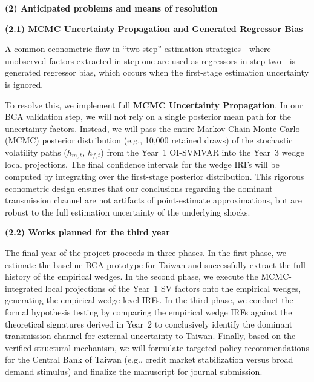 \bigskip

\noindent\textbf{(2) Anticipated problems and means of resolution}

\bigskip

\noindent\textbf{(2.1) MCMC Uncertainty Propagation and Generated Regressor Bias}

\medskip

A common econometric flaw in ``two-step'' estimation strategies---where unobserved factors extracted in step one are used as regressors in step two---is generated regressor bias, which occurs when the first-stage estimation uncertainty is ignored. 

To resolve this, we implement full \textbf{MCMC Uncertainty Propagation}. In our BCA validation step, we will not rely on a single posterior mean path for the uncertainty factors. Instead, we will pass the entire Markov Chain Monte Carlo (MCMC) posterior distribution (e.g., 10,000 retained draws) of the stochastic volatility paths ($h_{m,t}$, $h_{f,t}$) from the Year~1 OI-SVMVAR into the Year~3 wedge local projections. The final confidence intervals for the wedge IRFs will be computed by integrating over the first-stage posterior distribution. This rigorous econometric design ensures that our conclusions regarding the dominant transmission channel are not artifacts of point-estimate approximations, but are robust to the full estimation uncertainty of the underlying shocks.

\bigskip

\noindent\textbf{(2.2) Works planned for the third year}

\medskip

The final year of the project proceeds in three phases. In the first phase, we estimate the baseline BCA prototype for Taiwan and successfully extract the full history of the empirical wedges. In the second phase, we execute the MCMC-integrated local projections of the Year~1 SV factors onto the empirical wedges, generating the empirical wedge-level IRFs. In the third phase, we conduct the formal hypothesis testing by comparing the empirical wedge IRFs against the theoretical signatures derived in Year~2 to conclusively identify the dominant transmission channel for external uncertainty to Taiwan. Finally, based on the verified structural mechanism, we will formulate targeted policy recommendations for the Central Bank of Taiwan (e.g., credit market stabilization versus broad demand stimulus) and finalize the manuscript for journal submission.